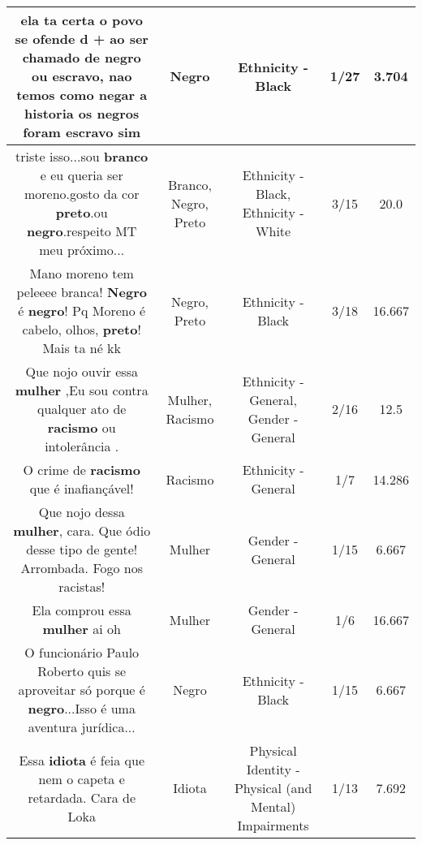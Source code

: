 \documentclass[11pt]{article}
\newlength\mylength
\begin{document}
\begin{center}
\begin{longtable}{|C{.65\mylength}|C{.30\mylength}|C{.12\mylength}|C{.12\mylength}|C{.12\mylength}|}
  \small ela ta certa o povo se ofende d + ao ser chamado de \textbf{negro} ou escravo, nao temos como negar a historia os negros foram escravo sim\normalsize   & Negro & Ethnicity - Black & 1/27 & 3.704 \\  \hline
  \small triste isso...sou \textbf{branco} e eu queria ser moreno.gosto da cor \textbf{preto}.ou \textbf{negro}.respeito MT meu próximo...\normalsize   & Branco, Negro, Preto & Ethnicity - Black, Ethnicity - White & 3/15 & 20.0 \\  \hline
  \small Mano moreno tem peleeee branca! \textbf{Negro} é \textbf{negro}! Pq Moreno é cabelo, olhos, \textbf{preto}! Mais ta né kk\normalsize   & Negro, Preto & Ethnicity - Black & 3/18 & 16.667 \\  \hline
  \small Que nojo ouvir essa \textbf{mulher} ,Eu sou contra qualquer ato de \textbf{racismo} ou intolerância  .\normalsize   & Mulher, Racismo & Ethnicity - General, Gender - General & 2/16 & 12.5 \\  \hline
  \small O crime de \textbf{racismo} que é inafiançável!\normalsize   & Racismo & Ethnicity - General & 1/7 & 14.286 \\  \hline
  \small Que nojo dessa \textbf{mulher}, cara. Que ódio desse tipo de gente! Arrombada. Fogo nos racistas!\normalsize   & Mulher & Gender - General & 1/15 & 6.667 \\  \hline
  \small Ela comprou essa \textbf{mulher} ai oh\normalsize   & Mulher & Gender - General & 1/6 & 16.667 \\  \hline
  \small O funcionário Paulo Roberto quis se aproveitar só porque é \textbf{negro}...Isso é uma aventura jurídica...\normalsize   & Negro & Ethnicity - Black & 1/15 & 6.667 \\  \hline
  \small Essa \textbf{idiota} é feia que nem o capeta e retardada.   Cara de Loka\normalsize   & Idiota & Physical Identity - Physical (and Mental) Impairments & 1/13 & 7.692 \\  \hline

\end{longtable}
\end{center}
\end{document}
